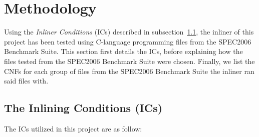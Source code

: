 
\clearpage
\section{Methodology}
\label{sec:methodology}

Using the \textit{Inliner Conditions} (ICs) described in
subsection~\ref{sub:meth:inlining_conditions}, the inliner of this project has
been tested using C-language programming files from the SPEC2006 Benchmark
Suite. This section first details the ICs, before explaining how the files
tested from the SPEC2006 Benchmark Suite were chosen. Finally, we list the CNFs
for each group of files from the SPEC2006 Benchmark Suite the inliner ran said
files with.

\subsection{The Inlining Conditions (ICs)}
\label{sub:meth:inlining_conditions}

The ICs utilized in this project are as follow:

